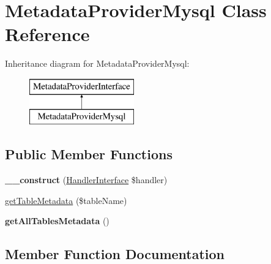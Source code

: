 \hypertarget{class_pes_1_1_database_1_1_metadata_1_1_metadata_provider_mysql}{}\section{Metadata\+Provider\+Mysql Class Reference}
\label{class_pes_1_1_database_1_1_metadata_1_1_metadata_provider_mysql}
Inheritance diagram for Metadata\+Provider\+Mysql\+:\begin{figure}[H]
\begin{center}
\leavevmode
\includegraphics[height=2.000000cm]{class_pes_1_1_database_1_1_metadata_1_1_metadata_provider_mysql}
\end{center}
\end{figure}
\subsection*{Public Member Functions}
\begin{DoxyCompactItemize}
\item 
\mbox{\label{class_pes_1_1_database_1_1_metadata_1_1_metadata_provider_mysql_ab2e9501469dd778b098cc85831c5c55f}} 
{\bfseries \+\_\+\+\_\+construct} (\mbox{\hyperlink{interface_pes_1_1_database_1_1_handler_1_1_handler_interface}{Handler\+Interface}} \$handler)
\item 
\mbox{\hyperlink{class_pes_1_1_database_1_1_metadata_1_1_metadata_provider_mysql_afa31de0e84c03f8daed9280bfa41a77f}{get\+Table\+Metadata}} (\$table\+Name)
\item 
\mbox{\label{class_pes_1_1_database_1_1_metadata_1_1_metadata_provider_mysql_a529d20b1def3376cce3dc2a192da6662}} 
{\bfseries get\+All\+Tables\+Metadata} ()
\end{DoxyCompactItemize}


\subsection{Member Function Documentation}
\mbox{\label{class_pes_1_1_database_1_1_metadata_1_1_metadata_provider_mysql_afa31de0e84c03f8daed9280bfa41a77f}} 
